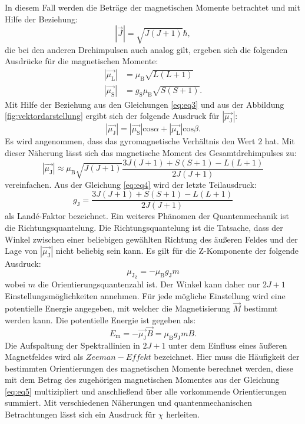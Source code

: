 In diesem Fall werden die Beträge der magnetischen Momente betrachtet und mit Hilfe der Beziehung:
\begin{equation*}
\left|\vec{J}\right| = \sqrt{J(J+1)}\hbar,
\end{equation*}
die bei den anderen Drehimpulsen auch analog gilt, ergeben sich die folgenden Ausdrücke für die magnetischen Momente:
\begin{align}
\label{eq:eq3}
\left|\vec{\mu_\text{L}}\right| &= \mu_\text{B}\sqrt{L(L+1)} \\
\left|\vec{\mu_\text{S}}\right| &= g_\text{S}\mu_\text{B}\sqrt{S(S+1)}.
\end{align}
Mit Hilfe der Beziehung aus den Gleichungen \ref{eq:eq3} und aus der Abbildung \ref{fig:vektordarstellung} ergibt sich der folgende Ausdruck für $\left|\vec{\mu_\text{J}}\right|$:
\begin{equation}
\left|\vec{\mu_\text{J}}\right| = \left|\vec{\mu_\text{S}}\right|\text{cos}\alpha + \left|\vec{\mu_\text{L}}\right|\text{cos}\beta.
\end{equation}
Es wird angenommen, dass das gyromagnetische Verhältnis den Wert $2$ hat. Mit dieser Näherung lässt sich das magnetische Moment des Gesamtdrehimpulses zu:
\begin{equation}
\label{eq:eq4}
\left|\vec{\mu_\text{J}}\right| \approx \mu_\text{B} \sqrt{J(J+1)} \frac{3J(J+1)+S(S+1)-L(L+1)}{2J(J+1)}
\end{equation}
vereinfachen. Aus der Gleichung \ref{eq:eq4} wird der letzte Teilausdruck:
\begin{equation*}
g_\text{J} = \frac{3J(J+1)+S(S+1)-L(L+1)}{2J(J+1)}
\end{equation*}
als Land\'{e}-Faktor bezeichnet. Ein weiteres Phänomen der Quantenmechanik ist die Richtungsquantelung. Die Richtungsquantelung ist die Tatsache, dass der Winkel zwischen einer beliebigen gewählten Richtung des äußeren Feldes und der Lage von $\left|\vec{\mu_\text{J}}\right|$ nicht beliebig sein kann. Es gilt für die Z-Komponente der folgende Ausdruck:
\begin{equation}
\label{eq:eq5}
\mu_{\text{J}_\text{Z}} = - \mu_\text{B}g_\text{J}m
\end{equation}
wobei $m$ die Orientierungsquantenzahl ist. Der Winkel kann daher nur $2J+1$ Einstellungsmöglichkeiten annehmen. Für jede mögliche Einstellung wird eine potentielle Energie angegeben, mit welcher die Magnetisierung $\vec{M}$ bestimmt werden kann. Die potentielle Energie ist gegeben als:
\begin{equation*}
E_\text{m} = - \vec{\mu_\text{J}}\vec{B} = \mu_\text{B}g_\text{J}mB.
\end{equation*}
Die Aufspaltung der Spektrallinien in $2J+1$ unter dem Einfluss eines äußeren Magnetfeldes wird als $\mathit{Zeeman-Effekt}$ bezeichnet. Hier muss die Häufigkeit der bestimmten Orientierungen des magnetischen Momente berechnet werden, diese mit dem Betrag des zugehörigen magnetischen Momentes aus der Gleichung \ref{eq:eq5} multizipliert und anschließend über alle vorkommende Orientierungen summiert. Mit verschiedenen Näherungen und quantenmechanischen Betrachtungen lässt sich ein Ausdruck für $\chi$ herleiten.

